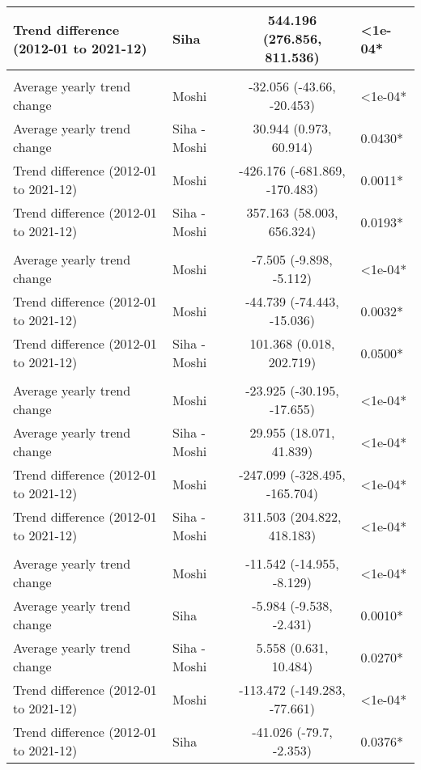 \begin{longtable}{l|lcl}
Trend difference (2012-01 to 2021-12) & Siha & 544.196 (276.856, 811.536) & <1e-04* \\ 
\midrule\addlinespace[2.5pt]
\multicolumn{4}{l}{Caries} \\[2.5pt] 
\midrule\addlinespace[2.5pt]
Average yearly trend change & Moshi & -32.056 (-43.66, -20.453) & <1e-04* \\ 
Average yearly trend change & Siha - Moshi & 30.944 (0.973, 60.914) & 0.0430* \\ 
Trend difference (2012-01 to 2021-12) & Moshi & -426.176 (-681.869, -170.483) & 0.0011* \\ 
Trend difference (2012-01 to 2021-12) & Siha - Moshi & 357.163 (58.003, 656.324) & 0.0193* \\ 
\midrule\addlinespace[2.5pt]
\multicolumn{4}{l}{Dysentery} \\[2.5pt] 
\midrule\addlinespace[2.5pt]
Average yearly trend change & Moshi & -7.505 (-9.898, -5.112) & <1e-04* \\ 
Trend difference (2012-01 to 2021-12) & Moshi & -44.739 (-74.443, -15.036) & 0.0032* \\ 
Trend difference (2012-01 to 2021-12) & Siha - Moshi & 101.368 (0.018, 202.719) & 0.0500* \\ 
\midrule\addlinespace[2.5pt]
\multicolumn{4}{l}{Skin Infection - Fungal} \\[2.5pt] 
\midrule\addlinespace[2.5pt]
Average yearly trend change & Moshi & -23.925 (-30.195, -17.655) & <1e-04* \\ 
Average yearly trend change & Siha - Moshi & 29.955 (18.071, 41.839) & <1e-04* \\ 
Trend difference (2012-01 to 2021-12) & Moshi & -247.099 (-328.495, -165.704) & <1e-04* \\ 
Trend difference (2012-01 to 2021-12) & Siha - Moshi & 311.503 (204.822, 418.183) & <1e-04* \\ 
\midrule\addlinespace[2.5pt]
\multicolumn{4}{l}{Malnutrition} \\[2.5pt] 
\midrule\addlinespace[2.5pt]
Average yearly trend change & Moshi & -11.542 (-14.955, -8.129) & <1e-04* \\ 
Average yearly trend change & Siha & -5.984 (-9.538, -2.431) & 0.0010* \\ 
Average yearly trend change & Siha - Moshi & 5.558 (0.631, 10.484) & 0.0270* \\ 
Trend difference (2012-01 to 2021-12) & Moshi & -113.472 (-149.283, -77.661) & <1e-04* \\ 
Trend difference (2012-01 to 2021-12) & Siha & -41.026 (-79.7, -2.353) & 0.0376* \\ 

\end{longtable}

